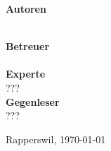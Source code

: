 \begin{titlepage}
\begin{minipage}{\linewidth}
	\end{minipage}
	\begin{minipage}{\linewidth}
	\begin{minipage}[t]{0.33\linewidth}
		\Large \textbf{Autoren} \\
		\Large \ubos \\
		\Large \pchr
	\end{minipage}
	\hfill\begin{minipage}[t]{0.5\linewidth}
		\Large \textbf{Betreuer} \\
		\Large \proff \\
		\textbf{\Large Experte}\\
		\Large ??? \\
		\textbf{\Large Gegenleser}\\
		\Large ???
	\end{minipage}
	\end{minipage}
		
	\begin{minipage}{0.33\linewidth}	
		
	\end{minipage}
	\begin{minipage}{0.33\linewidth}
		
		
	\end{minipage}
	\begin{minipage}{0.33\linewidth}
	
	\end{minipage}
	\vfill
	\Large Rapperswil, \today

\end{titlepage}

\restoregeometry
